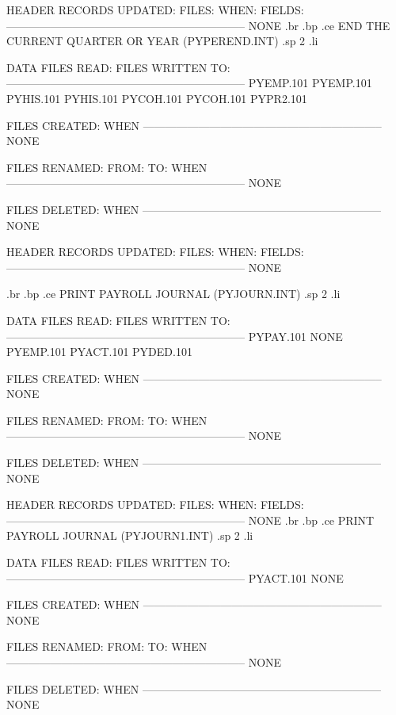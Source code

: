HEADER RECORDS UPDATED:
FILES:		 WHEN:		    FIELDS:
-----------------------------------------------------------------
      NONE
.br
.bp
.ce
END THE CURRENT QUARTER OR YEAR  (PYPEREND.INT)
.sp 2
.li

DATA FILES READ:		   FILES WRITTEN TO:
-----------------------------------------------------------------
       PYEMP.101			PYEMP.101
       PYHIS.101			PYHIS.101
       PYCOH.101			PYCOH.101
					PYPR2.101

FILES CREATED:			  WHEN
-----------------------------------------------------------------
       NONE


FILES RENAMED:
  FROM:        TO:		  WHEN
-----------------------------------------------------------------
       NONE


FILES DELETED:			  WHEN
-----------------------------------------------------------------
       NONE


HEADER RECORDS UPDATED:
FILES:		 WHEN:		    FIELDS:
-----------------------------------------------------------------
       NONE

.br
.bp
.ce
PRINT PAYROLL JOURNAL  (PYJOURN.INT)
.sp 2
.li

DATA FILES READ:		   FILES WRITTEN TO:
-----------------------------------------------------------------
       PYPAY.101			NONE
       PYEMP.101
       PYACT.101
       PYDED.101

FILES CREATED:			  WHEN
-----------------------------------------------------------------
       NONE


FILES RENAMED:
  FROM:        TO:		  WHEN
-----------------------------------------------------------------
       NONE


FILES DELETED:			  WHEN
-----------------------------------------------------------------
       NONE


HEADER RECORDS UPDATED:
FILES:		 WHEN:		    FIELDS:
-----------------------------------------------------------------
       NONE
.br
.bp
.ce
PRINT PAYROLL JOURNAL  (PYJOURN1.INT)
.sp 2
.li

DATA FILES READ:		   FILES WRITTEN TO:
-----------------------------------------------------------------
       PYACT.101			NONE

FILES CREATED:			  WHEN
-----------------------------------------------------------------
       NONE


FILES RENAMED:
  FROM:        TO:		  WHEN
-----------------------------------------------------------------
       NONE


FILES DELETED:			  WHEN
-----------------------------------------------------------------
       NONE


